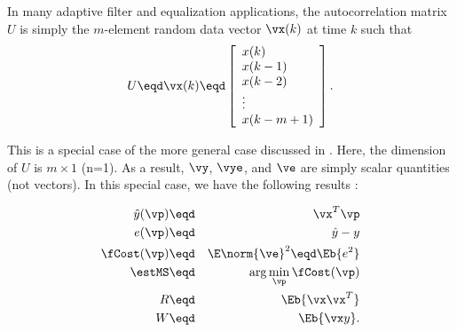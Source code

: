 \begin{example}
In many adaptive filter and equalization applications,
the autocorrelation matrix $U$ is simply the $m$-element
random data vector $\vx(k)$ at time $k$ such that
\[
   U \eqd \vx(k) \eqd
   \left[\begin{array}{l}
      x(k) \\
      x(k-1) \\
      x(k-2) \\
      \vdots \\
      x(k-m+1)
   \end{array}\right].
\]

This is a special case of the more general case discussed
in .
Here, the dimension of $U$ is $m\times1$ (n=1).
As a result,
$\vy$, $\vye$, and $\ve$ are simply scalar quantities (not vectors).
In this special case, we have the following results
:

\begin{align*}
   \hat{y}(\vp)   &\eqd& \vx^T \vp    \\
   e(\vp)    &\eqd& \hat{y}-y \\
   \fCost(\vp) &\eqd& \E\norm{\ve}^2 \eqd \Eb{e^2} \\
   \estMS      &\eqd& \arg\min_\vp \fCost(\vp)  \\
   R           &\eqd& \Eb{\vx\vx^T}   \\
   W           &\eqd& \Eb{ \vx y }.
\end{align*}

\end{example}


